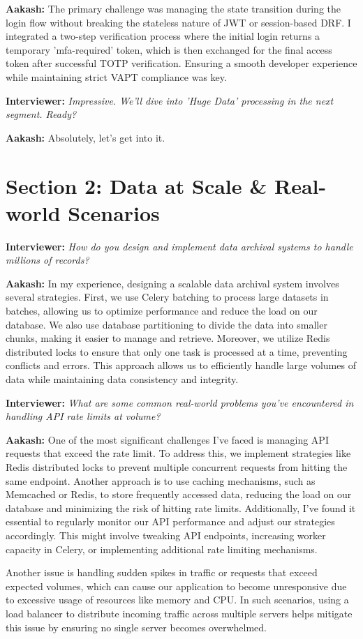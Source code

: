 \documentclass[12pt, a4paper]{article}
\newcommand{\interviewer}[1]{\noindent\textbf{Interviewer: }\textit{#1}\par\vspace{5pt}}
\newcommand{\candidate}[1]{\noindent\textbf{Aakash: }#1\par\vspace{15pt}}
\begin{document}
\candidate{The primary challenge was managing the state transition during the login flow without breaking the stateless nature of JWT or session-based DRF. I integrated a two-step verification process where the initial login returns a temporary 'mfa-required' token, which is then exchanged for the final access token after successful TOTP verification. Ensuring a smooth developer experience while maintaining strict VAPT compliance was key.}

\interviewer{Impressive. We'll dive into 'Huge Data' processing in the next segment. Ready?}

\candidate{Absolutely, let's get into it.}


\section*{Section 2: Data at Scale \& Real-world Scenarios}

\interviewer{How do you design and implement data archival systems to handle millions of records?}
\candidate{
In my experience, designing a scalable data archival system involves several strategies. First, we use Celery batching to process large datasets in batches, allowing us to optimize performance and reduce the load on our database. We also use database partitioning to divide the data into smaller chunks, making it easier to manage and retrieve.
Moreover, we utilize Redis distributed locks to ensure that only one task is processed at a time, preventing conflicts and errors. This approach allows us to efficiently handle large volumes of data while maintaining data consistency and integrity.
}

\interviewer{What are some common real-world problems you've encountered in handling API rate limits at volume?}
\candidate{
One of the most significant challenges I've faced is managing API requests that exceed the rate limit. To address this, we implement strategies like Redis distributed locks to prevent multiple concurrent requests from hitting the same endpoint.
Another approach is to use caching mechanisms, such as Memcached or Redis, to store frequently accessed data, reducing the load on our database and minimizing the risk of hitting rate limits.
Additionally, I've found it essential to regularly monitor our API performance and adjust our strategies accordingly. This might involve tweaking API endpoints, increasing worker capacity in Celery, or implementing additional rate limiting mechanisms.

Another issue is handling sudden spikes in traffic or requests that exceed expected volumes, which can cause our application to become unresponsive due to excessive usage of resources like memory and CPU. In such scenarios, using a load balancer to distribute incoming traffic across multiple servers helps mitigate this issue by ensuring no single server becomes overwhelmed.
}
\end{document}
